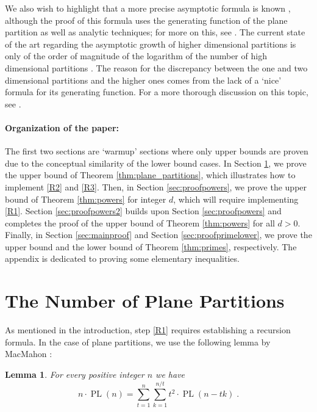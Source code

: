 \documentclass[11pt]{article}
\DeclareMathOperator{\PL}{PL}
\theoremstyle{plain}
\newtheorem{lemma}[theorem]{Lemma}
\begin{document}
We also wish to highlight that a more precise asymptotic formula is known \cite{Wri1931}, although the proof of this formula uses the generating function of the plane partition as well as analytic techniques; for more on this, see \cite{Sta1971}. The current state of the art regarding the asymptotic growth of higher dimensional partitions is only of the order of magnitude of the logarithm of the number of high dimensional partitions \cite{Solids}.
The reason for the discrepancy between the one and two dimensional partitions and the higher ones comes from the lack of a `nice' formula for its generating function. For a more thorough discussion on this topic, see \cite{Andrews1976}.



\paragraph{Organization of the paper:} The first two sections are `warmup' sections where only upper bounds are proven due to the conceptual similarity of the lower bound cases. In Section \ref{sec:planepartition}, we prove the upper bound of Theorem \ref{thm:plane_partitions}, which illustrates how to implement \ref{R2} and \ref{R3}. Then, in Section \ref{sec:proofpowers}, we prove the upper bound of Theorem \ref{thm:powers} for integer $d$, which will require implementing \ref{R1}. Section \ref{sec:proofpowers2} builds upon Section \ref{sec:proofpowers} and completes the proof of the upper bound of Theorem \ref{thm:powers} for all $d>0$. Finally, in Section \ref{sec:mainproof} and Section \ref{sec:proofprimelower}, we prove the upper bound and the lower bound of Theorem \ref{thm:primes}, respectively. The appendix is dedicated to proving some elementary inequalities.





\section{The Number of Plane Partitions}\label{sec:planepartition}

As mentioned in the introduction, step \ref{R1} requires establishing a recursion formula. In the case of plane partitions, we use the following lemma by MacMahon \cite{Mac1,Mac2,Mac3}:
\begin{lemma}\label{lem:recursion_plane_partitions}
    For every positive integer $n$ we have
    \[
         n\cdot \PL(n)= \sum_{t=1}^{n} \sum_{k=1}^{n/t}t^2 \cdot \PL(n-tk)\;.
    \]
\end{lemma}
\end{document}
